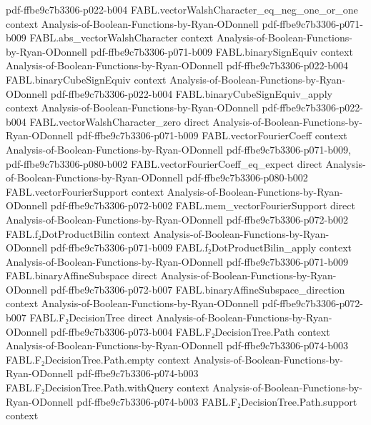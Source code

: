 \begin{theorem}
  {pdf-ffbe9c7b3306-p022-b004}
\proofstep
  {FABL.vectorWalshCharacter_eq_neg_one_or_one}
  {context}
  {Analysis-of-Boolean-Functions-by-Ryan-ODonnell}
  {pdf-ffbe9c7b3306-p071-b009}
\proofstep
  {FABL.abs_vectorWalshCharacter}
  {context}
  {Analysis-of-Boolean-Functions-by-Ryan-ODonnell}
  {pdf-ffbe9c7b3306-p071-b009}
\proofstep
  {FABL.binarySignEquiv}
  {context}
  {Analysis-of-Boolean-Functions-by-Ryan-ODonnell}
  {pdf-ffbe9c7b3306-p022-b004}
\proofstep
  {FABL.binaryCubeSignEquiv}
  {context}
  {Analysis-of-Boolean-Functions-by-Ryan-ODonnell}
  {pdf-ffbe9c7b3306-p022-b004}
\proofstep
  {FABL.binaryCubeSignEquiv_apply}
  {context}
  {Analysis-of-Boolean-Functions-by-Ryan-ODonnell}
  {pdf-ffbe9c7b3306-p022-b004}
\proofstep
  {FABL.vectorWalshCharacter_zero}
  {direct}
  {Analysis-of-Boolean-Functions-by-Ryan-ODonnell}
  {pdf-ffbe9c7b3306-p071-b009}
\proofstep
  {FABL.vectorFourierCoeff}
  {context}
  {Analysis-of-Boolean-Functions-by-Ryan-ODonnell}
  {pdf-ffbe9c7b3306-p071-b009,
    pdf-ffbe9c7b3306-p080-b002}
\proofstep
  {FABL.vectorFourierCoeff_eq_expect}
  {direct}
  {Analysis-of-Boolean-Functions-by-Ryan-ODonnell}
  {pdf-ffbe9c7b3306-p080-b002}
\proofstep
  {FABL.vectorFourierSupport}
  {context}
  {Analysis-of-Boolean-Functions-by-Ryan-ODonnell}
  {pdf-ffbe9c7b3306-p072-b002}
\proofstep
  {FABL.mem_vectorFourierSupport}
  {direct}
  {Analysis-of-Boolean-Functions-by-Ryan-ODonnell}
  {pdf-ffbe9c7b3306-p072-b002}
\proofstep
  {FABL.f₂DotProductBilin}
  {context}
  {Analysis-of-Boolean-Functions-by-Ryan-ODonnell}
  {pdf-ffbe9c7b3306-p071-b009}
\proofstep
  {FABL.f₂DotProductBilin_apply}
  {context}
  {Analysis-of-Boolean-Functions-by-Ryan-ODonnell}
  {pdf-ffbe9c7b3306-p071-b009}
\proofstep
  {FABL.binaryAffineSubspace}
  {direct}
  {Analysis-of-Boolean-Functions-by-Ryan-ODonnell}
  {pdf-ffbe9c7b3306-p072-b007}
\proofstep
  {FABL.binaryAffineSubspace_direction}
  {context}
  {Analysis-of-Boolean-Functions-by-Ryan-ODonnell}
  {pdf-ffbe9c7b3306-p072-b007}
\proofstep
  {FABL.F₂DecisionTree}
  {direct}
  {Analysis-of-Boolean-Functions-by-Ryan-ODonnell}
  {pdf-ffbe9c7b3306-p073-b004}
\proofstep
  {FABL.F₂DecisionTree.Path}
  {context}
  {Analysis-of-Boolean-Functions-by-Ryan-ODonnell}
  {pdf-ffbe9c7b3306-p074-b003}
\proofstep
  {FABL.F₂DecisionTree.Path.empty}
  {context}
  {Analysis-of-Boolean-Functions-by-Ryan-ODonnell}
  {pdf-ffbe9c7b3306-p074-b003}
\proofstep
  {FABL.F₂DecisionTree.Path.withQuery}
  {context}
  {Analysis-of-Boolean-Functions-by-Ryan-ODonnell}
  {pdf-ffbe9c7b3306-p074-b003}
\proofstep
  {FABL.F₂DecisionTree.Path.support}
  {context}

\end{theorem}
